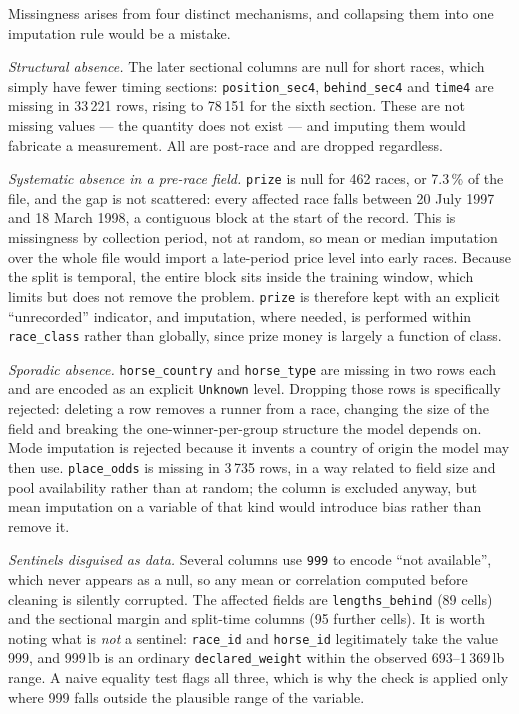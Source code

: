 Missingness arises from four distinct mechanisms, and collapsing them into
one imputation rule would be a mistake.

\emph{Structural absence.} The later sectional columns are null for short
races, which simply have fewer timing sections: \texttt{position\_sec4},
\texttt{behind\_sec4} and \texttt{time4} are missing in 33\,221 rows,
rising to 78\,151 for the sixth section. These are not missing values ---
the quantity does not exist --- and imputing them would fabricate a
measurement. All are post-race and are dropped regardless.

\emph{Systematic absence in a pre-race field.} \texttt{prize} is null for
462 races, or 7.3\,\% of the file, and the gap is not scattered: every
affected race falls between 20 July 1997 and 18 March 1998, a contiguous
block at the start of the record. This is missingness by collection
period, not at random, so mean or median imputation over the whole file
would import a late-period price level into early races. Because the split
is temporal, the entire block sits inside the training window, which
limits but does not remove the problem. \texttt{prize} is therefore kept
with an explicit ``unrecorded'' indicator, and imputation, where needed,
is performed within \texttt{race\_class} rather than globally, since prize
money is largely a function of class.

\emph{Sporadic absence.} \texttt{horse\_country} and \texttt{horse\_type}
are missing in two rows each and are encoded as an explicit
\texttt{Unknown} level. Dropping those rows is specifically rejected:
deleting a row removes a runner from a race, changing the size of the
field and breaking the one-winner-per-group structure the model depends
on. Mode imputation is rejected because it invents a country of origin the
model may then use. \texttt{place\_odds} is missing in 3\,735 rows, in a
way related to field size and pool availability rather than at random; the
column is excluded anyway, but mean imputation on a variable of that kind
would introduce bias rather than remove it.

\emph{Sentinels disguised as data.} Several columns use \texttt{999} to
encode ``not available'', which never appears as a null, so any mean or
correlation computed before cleaning is silently corrupted. The affected
fields are \texttt{lengths\_behind} (89 cells) and the sectional margin
and split-time columns (95 further cells). It is worth noting what is
\emph{not} a sentinel: \texttt{race\_id} and \texttt{horse\_id} legitimately
take the value 999, and 999\,lb is an ordinary \texttt{declared\_weight}
within the observed 693--1\,369\,lb range. A naive equality test flags all
three, which is why the check is applied only where 999 falls outside the
plausible range of the variable.

